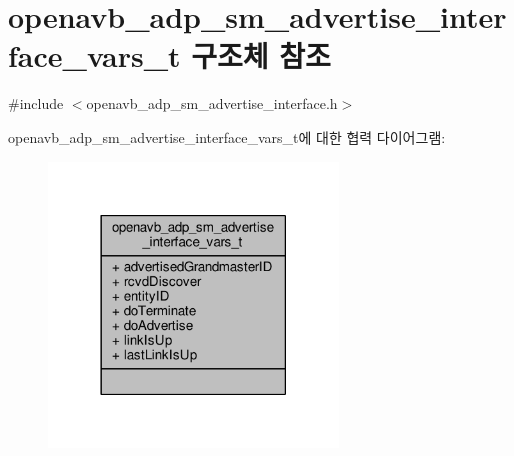 \hypertarget{structopenavb__adp__sm__advertise__interface__vars__t}{}\section{openavb\+\_\+adp\+\_\+sm\+\_\+advertise\+\_\+interface\+\_\+vars\+\_\+t 구조체 참조}
\label{structopenavb__adp__sm__advertise__interface__vars__t}


{\ttfamily \#include $<$openavb\+\_\+adp\+\_\+sm\+\_\+advertise\+\_\+interface.\+h$>$}



openavb\+\_\+adp\+\_\+sm\+\_\+advertise\+\_\+interface\+\_\+vars\+\_\+t에 대한 협력 다이어그램\+:
\nopagebreak
\begin{figure}[H]
\begin{center}
\leavevmode
\includegraphics[width=218pt]{structopenavb__adp__sm__advertise__interface__vars__t__coll__graph}
\end{center}
\end{figure}
